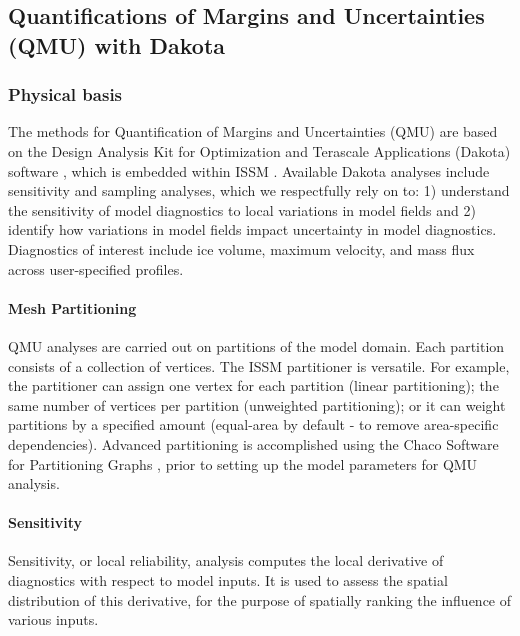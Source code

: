 
\subsection{Quantifications of Margins and Uncertainties (QMU) with Dakota} \label{sec:using-issm-advanced-qmu-dakota}
\subsubsection{Physical basis}
The methods for Quantification of Margins and Uncertainties (QMU) are based on the Design Analysis Kit for Optimization and Terascale Applications (Dakota) software \citep{Eldred2008}, which is embedded within ISSM \citep{Larour2012b,Larour2012a}.  Available Dakota analyses include sensitivity and sampling analyses, which we respectfully rely on to: 1) understand the sensitivity of model diagnostics to local variations in model fields and 2) identify how variations in model fields impact uncertainty in model diagnostics.  Diagnostics of interest include ice volume, maximum velocity, and mass flux across user-specified profiles.

\paragraph{Mesh Partitioning}
QMU analyses are carried out on partitions of the model domain. Each partition consists of a collection of vertices.  The ISSM partitioner is versatile. For example, the partitioner can assign one vertex for each partition (linear partitioning); the same number of vertices per partition (unweighted partitioning); or it can weight partitions by a specified amount (equal-area by default - to remove area-specific dependencies).  Advanced partitioning is accomplished using the Chaco Software for Partitioning Graphs \citep{Hendrickson1995}, prior to setting up the model parameters for QMU analysis.

\paragraph{Sensitivity}
Sensitivity, or local reliability, analysis computes the local derivative of diagnostics with respect to model inputs. It is used to assess the spatial distribution of this derivative, for the purpose of spatially ranking the influence of various inputs.

